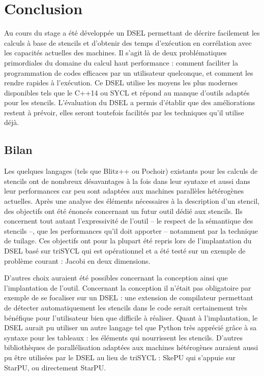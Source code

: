 
\chapter{Conclusion}

Au cours du stage a été développée un DSEL permettant de décrire facilement les calculs à base de stencils et d'obtenir des temps d'exécution en corrélation avec les capacités actuelles des machines. Il s'agit là de deux problématiques primordiales du domaine du calcul haut performance : comment faciliter la programmation de codes efficaces par un utilisateur quelconque, et comment les rendre rapides à l'exécution. Ce DSEL utilise les moyens les plus modernes disponibles tels que le \textsf{C++14} ou \textsf{SYCL} et répond au manque d'outils adaptés pour les stencils. L'évaluation du DSEL a permis d'établir que des améliorations restent à prévoir, elles seront toutefois facilités par les techniques qu'il utilise déjà. 

\section{Bilan}

Les quelques langages (tels que \textsf{Blitz++} ou \textsf{Pochoir}) existants pour les calculs de stencils ont de nombreux désavantages à la fois dans leur syntaxe et aussi dans leur performances car peu sont adaptées aux machines parallèles hétérogènes actuelles. Après une analyse des éléments nécessaires à la description d'un stencil, des objectifs ont été énoncés concernant un futur outil dédié aux stencils. Ils concernent tout autant l'expressivité de l'outil -- le respect de la sémantique des stencils --, que les performances qu'il doit apporter -- notamment par la technique de tuilage. Ces objectifs ont pour la plupart été repris lors de l'implantation du DSEL basé sur \textsf{triSYCL} qui est opérationnel et a été testé sur un exemple de problème courant : Jacobi en deux dimensions. 

D'autres choix auraient été possibles concernant la conception ainsi que l'implantation de l'outil. Concernant la conception il n'était pas obligatoire par exemple de se focaliser sur un DSEL : une extension de compilateur permettant de détecter automatiquement les stencils dans le code serait certainement très bénéfique pour l'utilisateur bien que difficile à réaliser. Quant à l'implantation, le DSEL aurait pu utiliser un autre langage tel que \textsf{Python} très apprécié grâce à sa syntaxe pour les tableaux : les éléments qui nourrissent les stencils. D'autres bibliothèques de parallélisation adaptées aux machines hétérogènes auraient aussi pu être utilisées par le DSEL au lieu de \textsf{triSYCL} : \textsf{SkePU} qui s'appuie sur \textsf{StarPU}, ou directement \textsf{StarPU}.

